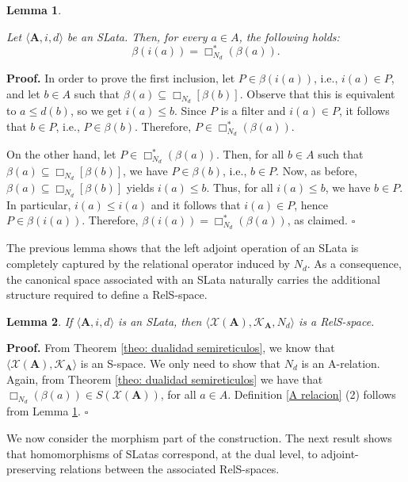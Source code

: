 \documentclass{article}
\newtheorem{lemma}{\bf Lemma}[section]
\newenvironment{proof}
{\par\noindent\textbf{Proof. }\rm}
{\hfill$\boldsymbol{\square}$\par\vspace{0.3cm}}
\begin{document}
\begin{lemma}\label{beta(i(a))}
   
Let $\langle \mathbf{A},i,d\rangle$ be an SLata. Then, for every $a \in A$, the following holds:
\[
\beta(i(a))=\Box_{N_d}^{\ast}(\beta(a)).
\]
\end{lemma}

\begin{proof}
In order to prove the first inclusion, let $P \in \beta(i(a))$, i.e., $i(a)\in P$, and let $b \in A$ such that $\beta(a)\subseteq \Box_{N_d}[\beta(b)]$. Observe that this is equivalent to $a \leq d(b)$, so we get $i(a)\leq b$. Since $P$ is a filter and $i(a)\in P$, it follows that $b \in P$, i.e., $P \in \beta(b)$. Therefore, $P\in \Box_{N_d}^{\ast}(\beta(a))$.

On the other hand, let $P \in \Box_{N_d}^{\ast}(\beta(a))$.  
Then, for all $b \in A$ such that $\beta(a)\subseteq \Box_{N_d}[\beta(b)]$, we have $P \in \beta(b)$, i.e., $b \in P$. Now, as before, $\beta(a)\subseteq \Box_{N_d}[\beta(b)]$ yields $i(a)\leq b$. Thus, for all $i(a)\leq b$, we have $b \in P$. In particular,  $i(a)\leq i(a)$ and it follows that $i(a)\in P$, hence $P \in \beta(i(a))$. Therefore, $\beta(i(a))=\Box_{N_d}^{\ast}(\beta(a))$, as claimed.
\end{proof}

The previous lemma shows that the left adjoint operation of an SLata is completely captured by the relational operator induced by $N_d$. As a consequence, the canonical space associated with an SLata naturally carries the additional structure required to define a RelS-space.

\begin{lemma}\label{X(A) es rel s space}
    If $\langle \mathbf{A}, i, d \rangle$ is an SLata, then $\langle \mathcal{X}(\mathbf{A}), \mathcal{K}_\mathbf{A}, N_d \rangle$ is a RelS-space.
\end{lemma}
\begin{proof}
   From Theorem \ref{theo: dualidad semireticulos}, we know that $\langle \mathcal{X}(\mathbf{A}), \mathcal{K}_\mathbf{A}\rangle$ is an S-space. We only need to show that $N_d$ is an A-relation. 
    Again, from Theorem \ref{theo: dualidad semireticulos}  we have that $\Box_{N_d}(\beta(a)) \in S(\mathcal{X}(\mathbf{A}))$, for all $a \in A$. Definition \ref{A relacion} (2) follows from Lemma \ref{beta(i(a))}.
\end{proof}

We now consider the morphism part of the construction. The next result shows that homomorphisms of SLatas correspond, at the dual level, to adjoint-preserving relations between the associated RelS-spaces.
\end{document}
